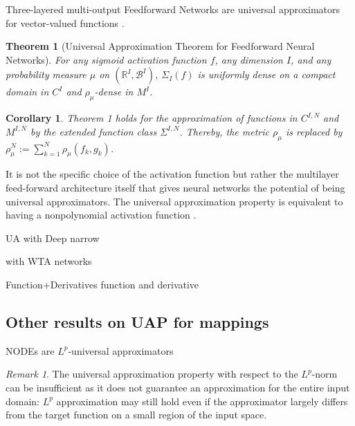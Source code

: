 \documentclass{article}
\newtheorem{theorem}{Theorem}
\newtheorem{corollary}{Corollary}[theorem]
\theoremstyle{definition}
\theoremstyle{remark}
\newtheorem{remark}{Remark}
\newcounter{ct}
\begin{document}
Three-layered multi-output Feedforward Networks are universal approximators for vector-valued functions \citep{irie1988capabilities}.

\begin{theorem}[Universal Approximation Theorem for Feedforward Neural Networks\citep{hornik1989multilayer,schafer2007uap}]
For any sigmoid activation function \( f \), any dimension \( I \), and any probability measure \( \mu \) on \( (\mathbb{R}^I, \mathcal{B}^I) \), \( \Sigma_I(f) \) is uniformly dense on a compact domain in \( C^I \) and \( \rho_{\mu} \)-dense in \( M^I \).
\end{theorem}

\begin{corollary}%
Theorem 1 holds for the approximation of functions in \( C^{I,N} \) and \( M^{I,N} \) by the extended function class \( \Sigma^{I,N} \). Thereby, the metric \( \rho_{\mu} \) is replaced by \( \rho_{\mu}^N := \sum_{k=1}^{N} \rho_{\mu}(f_k, g_k) \).
\end{corollary}



It is not the specific choice of the activation function but rather the multilayer feed-forward architecture itself that gives neural networks the potential of being universal approximators\citep{hornik1991approximation}.
%
The universal approximation property is equivalent to having a nonpolynomial activation function \citep{pinkus1999approximation}.

\citep{mhaskar1997neural}

UA with Deep narrow \citep{kidger2020universal}

with WTA networks \citep{maass2000wta}

Function+Derivatives \citep{hornik1990universal}
function and derivative \citep{li1996simultaneous}


\subsection{Other results on UAP for mappings}
NODEs are $L^p$-universal approximators \citep{li2022deep,li2022deeparxiv}
\begin{remark}
The universal approximation property with respect to the $L^p$-norm can be insufficient as it does not guarantee an approximation for the entire input domain:
 $L^p$ approximation may still hold even if the approximator largely differs from the target function on a small region of the input space.
\end{remark}
\end{document}
